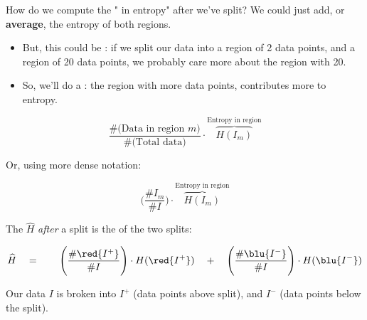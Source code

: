 
        How do we compute the " in entropy" after we've split? We could just add, or \textbf{average}, the entropy of both regions.

        \begin{itemize}
            \item But, this could be : if we split our data into a region of 2 data points, and a region of 20 data points, we probably care more about the region with 20.

            \item So, we'll do a : the region with more data points, contributes more to entropy.
        \end{itemize}

        \begin{equation}
            \frac{\# \text{(Data in region $m$)}}{\# \text{(Total data)}} \cdot \overbrace{H(I_m)}^{\text{Entropy in region}}
        \end{equation}

        Or, using more dense notation:

        \begin{equation}
            \Bigg( \frac{\# I_m}{\#I} \Bigg) \cdot \overbrace{H(I_m)}^{\text{Entropy in region}}
        \end{equation}

        \begin{kequation}
            The  $\widehat{H}$ \textit{after} a split is the  of the two splits:

            \begin{equation*}
                \widehat{H} 
                \quad=\qquad 
                \Bigg(\frac{\#\red{I^+}}{\#I} \Bigg) \cdot H(\red{I^+}) 
                \quad+\quad 
                \Bigg(\frac{\#\blu{I^-}}{\#I} \Bigg) \cdot H(\blu{I^-})
            \end{equation*}

            Our data $I$ is broken into $I^+$ (data points above split), and $I^-$ (data points below the split).
        \end{kequation}

